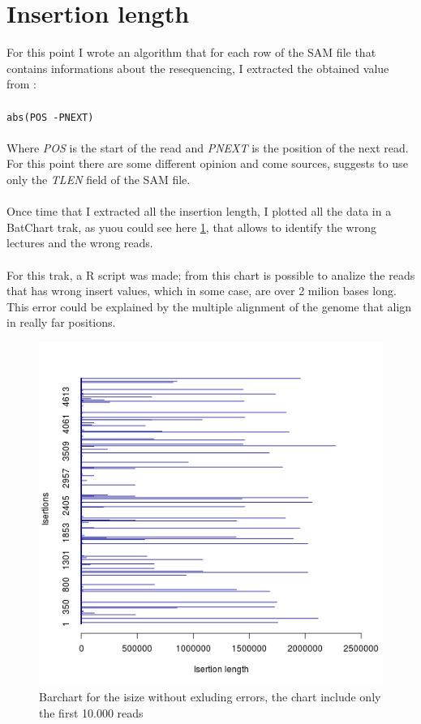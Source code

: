 \section{Insertion length}
For this point I wrote an algorithm that for each row of the SAM file that contains informations about the resequencing, I extracted the obtained value from :
\\
\\
\verb|abs(POS -PNEXT)|
\\
\\
Where \emph{POS} is the start of the read and \emph{PNEXT} is the position of the next read.\\
For this point there are some different opinion and come sources, suggests to use only the \emph{TLEN} field of the SAM file.
\\\\
Once time that I extracted all the insertion length, I plotted all the data in a BatChart trak, as yuou could see here \ref{fig:1}, that allows to identify the wrong lectures and the wrong reads.
\\\\
For this trak, a R script was made; from this chart is possible to analize the reads that has wrong insert values, which in some case, are over 2 milion bases long.\\

This error could be explained by the multiple alignment of the genome that align in really far positions.

 \begin{figure}[H]
				\centering
				\includegraphics[scale=0.8]{immagini/r.png}
				\caption{Barchart for the isize without exluding errors, the chart include only the first 10.000 reads}\label{fig:1}
				\end{figure}

